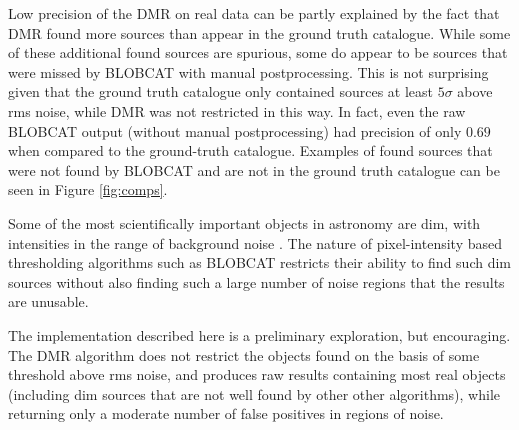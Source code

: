 \documentclass[
    ,final            %
  ]
  {aipproc}
\begin{document}
% 
% 
Low precision of the DMR on real data can be partly explained by the fact that DMR found more sources than appear in the ground truth catalogue. While some of these additional found sources are spurious, some do appear to be sources that were missed by BLOBCAT with manual postprocessing. This is not surprising given that the ground truth catalogue only contained sources at least $5 \sigma$ above rms noise, while DMR was not restricted in this way. In fact, even the raw BLOBCAT output (without manual postprocessing) had precision of only $0.69$ when compared to the ground-truth catalogue. Examples of found sources that were not found by BLOBCAT and are not in the ground truth catalogue can be seen in Figure \ref{fig:comps}.

Some of the most scientifically important objects in astronomy are dim, with intensities in the range of background noise \cite{norris2011emu}. The nature of pixel-intensity based thresholding algorithms such as BLOBCAT restricts their ability to find such dim sources without also finding such a large number of noise regions that the results are unusable. 

The implementation described here is a preliminary exploration, but encouraging. The DMR algorithm does not restrict the objects found on the basis of some threshold above rms noise, and produces raw results containing most real objects (including dim sources that are not well found by other other algorithms), while returning only a moderate number of false positives in regions of noise.
\end{document}
